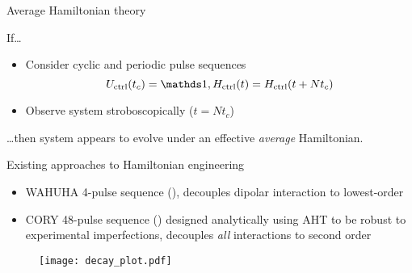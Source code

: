 \documentclass{beamer}
\begin{document}
\begin{frame}{Average Hamiltonian theory}

If\dots
\begin{itemize}
    \item Consider cyclic and periodic pulse sequences
    \[
    U_{\text{ctrl}}(t_c) = \identity, H_{\text{ctrl}}(t) = H_{\text{ctrl}}(t + Nt_c)
    \]
    \item Observe system stroboscopically ($t = Nt_c$)
\end{itemize}
\dots then system appears to evolve under an effective \emph{average} Hamiltonian.

\begin{figure}
\centering
\scalebox{.7}{

}
\end{figure}


\end{frame}

\begin{frame}{Existing approaches to Hamiltonian engineering}

\begin{itemize}
    \item WAHUHA 4-pulse sequence (\cite{PhysRevLett.20.180}), decouples dipolar interaction to lowest-order

    \item CORY 48-pulse sequence (\cite{CORY1990205}) designed analytically using AHT to be robust to experimental imperfections, decouples \emph{all} interactions to second order
\end{itemize}

\begin{figure}
\centering
\texttt{[image: decay\_plot.pdf]}
\end{figure}


\end{frame}
\end{document}
